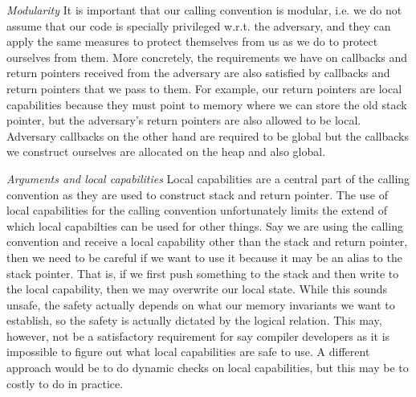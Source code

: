 \documentclass[acmsmall,review]{acmart}\settopmatter{printfolios=true}
\begin{document}
\emph{Modularity} It is important that our calling convention is modular, i.e.
we do not assume that our code is specially privileged w.r.t. the adversary, and
they can apply the same measures to protect themselves from us as we do to
protect ourselves from them. More concretely, the requirements we have on
callbacks and return pointers received from the adversary are also satisfied by
callbacks and return pointers that we pass to them. For example, our return
pointers are local capabilities because they must point to memory where we can
store the old stack pointer, but the adversary's return pointers are also
allowed to be local. Adversary callbacks on the other hand are required to
be global but the callbacks we construct ourselves are allocated on the heap and
also global. 

\emph{Arguments and local capabilities} 
Local capabilities are a central part of the calling convention as they are used
to construct stack and return pointer. The use of local capabilities for the
calling convention unfortunately limits the extend of which local capabilties
can be used for other things. Say we are using the calling convention and
receive a local capability other than the stack and return pointer, then we need
to be careful if we want to use it because it may be an alias to the stack
pointer. That is, if we first push something to the stack and then write to the
local capability, then we may overwrite our local state. While this sounds
unsafe, the safety actually depends on what our memory invariants we want to
establish, so the safety is actually dictated by the logical relation. This may,
however, not be a satisfactory requirement for say compiler developers as it is
impossible to figure out what local capabilities are safe to use. A different
approach would be to do dynamic checks on local capabilities, but this may be to
costly to do in practice.
\end{document}
